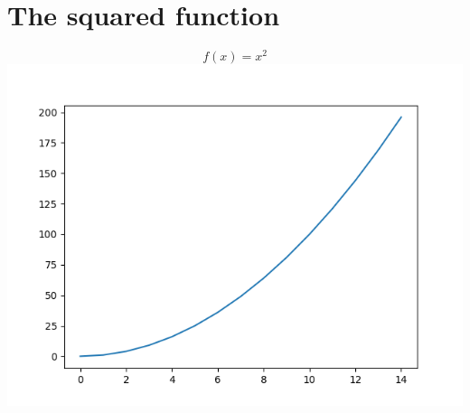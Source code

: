 \documentclass{article}
\begin{document}
 \section{The squared function} 
 \[
   f(x) = x^2
 \]
 \includegraphics[scale=0.8]{plot-data.png}
\end{document}
